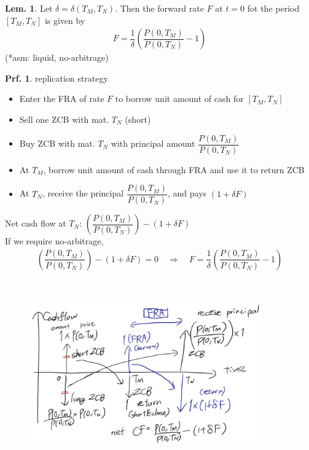 \documentclass[a4paper,11pt]{jsarticle}
\theoremstyle{definition}
\newtheorem{lem}{Lem.}[subsection]
\newtheorem{prf}{Prf.}[subsection]
\newcommand{\df}[2]{\dfrac{#1}{#2}}
\begin{document}
\begin{lem}
  Let $\delta=\delta (T_M,T_N)$. Then the forward rate $F$
  at $t=0$ fot the period $[T_M,T_N]$ is given by
  \begin{align}
    F=\df{1}{\delta}\left(\df{P(0,T_M)}{P(0,T_N)}-1\right)
  \end{align}
  (*asm: liquid, no-arbitrage)

  \begin{prf}{replication strategy}
    \begin{itemize}
      \item Enter the FRA of rate $F$ to borrow
      unit amount of cash for $[T_M,T_N]$
      \item Sell one ZCB with mat. $T_N$ (short)
      \item Buy ZCB with mat. $T_N$ with principal amount
      $\df{P(0,T_M)}{P(0,T_N)}$
      \item At $T_M$, borrow unit amount of cash through FRA
      and use it to return ZCB
      \item At $T_N$, receive the principal $\df{P(0,T_M)}{P(0,T_N)}$,
      and pays $(1+\delta F)$
    \end{itemize}
    
    Net cash flow at $T_N$:
    $\left(\df{P(0,T_M)}{P(0,T_N)}\right)-(1+\delta F)$ \\
    If we require no-arbitrage, 
    \begin{align}
      \left(\df{P(0,T_M)}{P(0,T_N)}\right)-(1+\delta F)=0
      \quad \Rightarrow \quad
      F=\df{1}{\delta}\left(\df{P(0,T_M)}{P(0,T_N)}-1\right)
    \end{align}
  \end{prf}
\end{lem}

\begin{figure}[H]　%
  \begin{center}
    \includegraphics[width=10cm]{fig/1_3_01.JPG}
  \end{center}
\end{figure}
\end{document}
